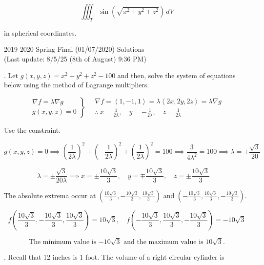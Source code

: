 \documentclass{article}
\begin{document}
\[\iiint_T\sin\left(\sqrt{x^2+y^2+z^2}\right)\,dV\]

\hfill

\noindent in spherical coordinates.

\newpage

\begin{center}
2019-2020 Spring Final (01/07/2020) Solutions\\
(Last update: 8/5/25 (8th of August) 9:36 PM)
\end{center}

. Let $g(x,y,z)=x^2+y^2+z^2-100$ and then, solve the system of equations below using the method of Lagrange multipliers.

\[
\left.
\begin{array}{l}
\displaystyle\nabla f=\lambda\nabla g\\
\displaystyle g(x,y,z)=0
\end{array}
\right\}\quad\begin{array}{c}
\nabla f=\left\langle1,-1,1\right\rangle=\lambda\left\langle2x,2y,2z\right\rangle=\lambda\nabla g\\[1em]\displaystyle\therefore\: x=\frac1{2\lambda},\quad y=-\frac1{2\lambda},\quad z=\frac1{2\lambda}
\end{array}
\]

\hfill

\noindent Use the constraint.

\[g(x,y,z)=0\implies\left(\frac1{2\lambda}\right)^2+\left(-\frac1{2\lambda}\right)^2+\left(\frac1{2\lambda}\right)^2=100\implies\frac3{4\lambda^2}=100\implies\lambda=\pm\frac{\sqrt3}{20}\]

\[\lambda=\pm\frac{\sqrt3}{20\lambda}\implies x=\pm\frac{10\sqrt3}3,\quad y=\mp\frac{10\sqrt3}3,\quad z=\pm\frac{10\sqrt3}3\quad\]

\hfill

\noindent The absolute extrema occur at $\left(\frac{10\sqrt3}3,-\frac{10\sqrt3}3,\frac{10\sqrt3}3\right)$ and $\left(-\frac{10\sqrt3}3,\frac{10\sqrt3}3,-\frac{10\sqrt3}3\right)$.

\[f\left(\frac{10\sqrt3}3,-\frac{10\sqrt3}3,\frac{10\sqrt3}3\right)=10\sqrt3,\quad f\left(-\frac{10\sqrt3}3,\frac{10\sqrt3}3,-\frac{10\sqrt3}3\right)=-10\sqrt3\]

\[\boxed{\text{The minimum value is }{-10\sqrt3}\text{ and the maximum value is }10\sqrt3.}\]

\hfill

. Recall that 12 inches is 1 foot. The volume of a right circular cylinder is
\end{document}
